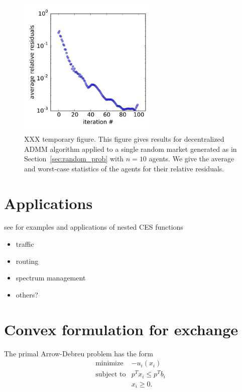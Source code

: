 \documentclass[12pt]{article}
\begin{document}
\begin{figure}
\begin{center}
\includegraphics[width=0.6\textwidth]{figures/admm}
\caption{XXX temporary figure. This figure gives results for decentralized ADMM algorithm applied to a single random market generated as in Section~\ref{sec:random_prob} with $n=10$ agents. We give the average and worst-case statistics of the agents for their relative residuals.}
\end{center}
\label{f-cvxpy}
\end{figure}



\section{Applications}
\cite{shoven1992applying}

see \cite{shoven1992applying} for examples and applications of nested CES functions

\begin{itemize}
\item traffic
\item routing
\item spectrum management
\item others?
\end{itemize}

\appendix




\section{Convex formulation for exchange}
\label{sec:exchange_proof}
The primal Arrow-Debreu problem has the form
\[
\begin{array}{ll}
\mbox{minimize} & - u_i(x_i)\\
\mbox{subject to} & p^T x_i \leq p^T b_i\\
& x_i \geq 0.
\end{array}
\]
\end{document}
